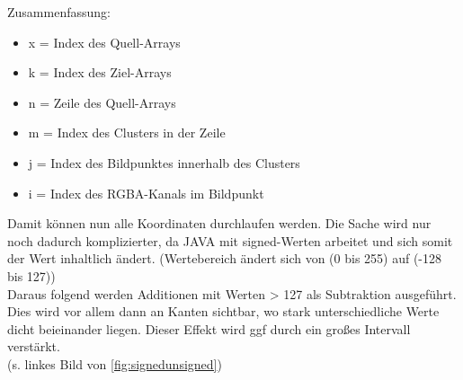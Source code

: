 \begin{description}
\begin{lstlisting}
\end{lstlisting}
Zusammenfassung:
\begin{itemize}
\item x = Index des Quell-Arrays
\item k = Index des Ziel-Arrays
\item n = Zeile des Quell-Arrays
\item m = Index des Clusters in der Zeile
\item j = Index des Bildpunktes innerhalb des Clusters
\item i = Index des RGBA-Kanals im Bildpunkt   
\end{itemize}
Damit können nun alle Koordinaten durchlaufen werden. Die Sache wird nur noch dadurch komplizierter, da JAVA mit signed-Werten arbeitet und sich somit der Wert inhaltlich ändert. (Wertebereich ändert sich von (0 bis 255) auf (-128 bis 127))\\
Daraus folgend werden Additionen mit Werten > 127 als Subtraktion ausgeführt. Dies wird vor allem dann an Kanten sichtbar, wo stark unterschiedliche Werte dicht beieinander liegen. Dieser Effekt wird ggf durch ein großes Intervall verstärkt. 
\\
(s. linkes Bild von \ref{fig:signedunsigned})


\end{description}
